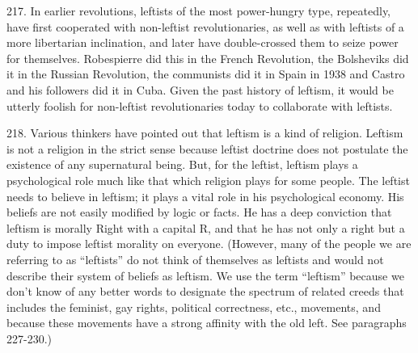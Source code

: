 \documentclass{article}
\begin{document}
217.  In earlier revolutions, leftists of the most power-hungry type, repeatedly, have first 
cooperated with non-leftist revolutionaries, as well as with leftists of a more libertarian inclination, 
and  later  have  double-crossed  them  to  seize  power  for  themselves.   Robespierre  did  this  in  the  
French Revolution, the Bolsheviks did it in the Russian Revolution, the communists did it in Spain 
in 1938 and Castro and his followers did it in Cuba.  Given the past history of leftism, it would be 
utterly foolish for non-leftist revolutionaries today to collaborate with leftists. \vspace{\baselineskip}

218.  Various thinkers have pointed out that leftism is a kind of religion.  Leftism is not a religion 
in  the  strict  sense  because  leftist  doctrine  does  not  postulate  the  existence  of  any  supernatural  
being.  But, for the leftist, leftism plays a psychological role much like that which religion plays 
for some people.  The leftist needs to believe in leftism; it plays a vital role in his psychological 
economy.   His  beliefs  are  not  easily  modified  by  logic  or  facts.   He  has  a  deep  conviction  that  
leftism  is  morally  Right  with  a  capital  R,  and  that  he  has  not  only  a  right  but  a  duty  to  impose  
leftist morality on everyone.  (However, many of the people we are referring to as “leftists” do not 
think of themselves as leftists and would not describe their system of beliefs as leftism.  We use 
the term “leftism” because we don’t know of any better words to designate the spectrum of related 
creeds that includes the feminist, gay rights, political correctness, etc., movements, and because 
these movements have a strong affinity with the old left.  See paragraphs 227-230.) \vspace{\baselineskip}
\end{document}
